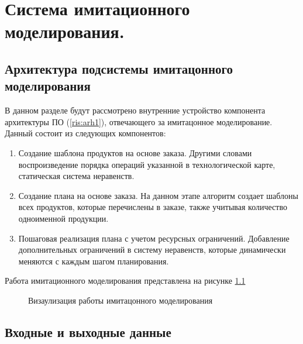 \chapter{Система имитационного моделирования.}

\section{Архитектура подсистемы имитацонного моделирования}

В данном разделе будут рассмотрено внутренние устройство компонента архитектуры ПО (\ref{ris:arh1}), отвечающего за имитацонное моделирование. 
Данный состоит из следующих компонентов:

\begin{enumerate}
    \item Создание шаблона продуктов на основе заказа. Другими словами воспроизведение порядка операций указанной в технологической карте, статическая система неравенств.
    \item Создание плана на основе заказа. На данном этапе алгоритм создает шаблоны всех продуктов, которые перечислены в заказе, также учитывая количество одноименной продукции.
    \item Пошаговая реализация плана с учетом ресурсных ограничений. Добавление дополнительных ограничений в систему неравенств, которые динамически меняются с каждым шагом планирования.
\end{enumerate}

Работа имитационного моделирования представлена на рисунке \ref{ris:alg}
\begin{figure}[H]
    \caption{Визаулизация работы имитацонного моделирования}
    \label{ris:alg}
\end{figure}

\section{Входные и выходные данные}

